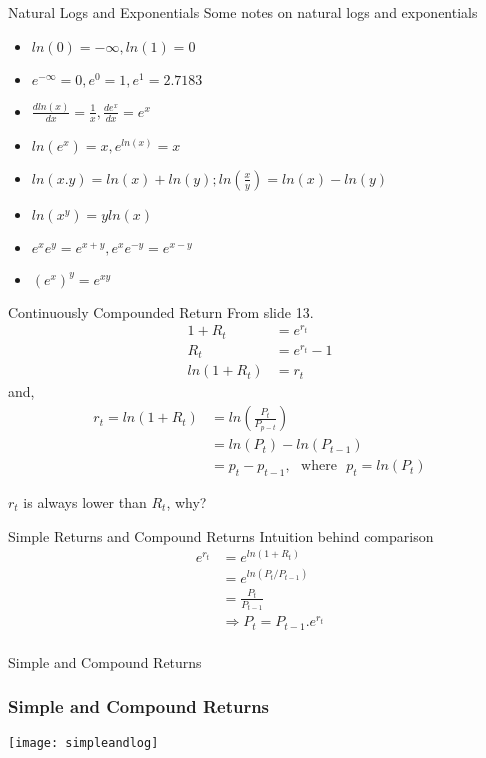\documentclass[14pt,xcolor=pdftex,dvipsnames,table]{beamer}
\begin{document}
\begin{frame}{Natural Logs and Exponentials}
Some notes on natural logs and exponentials
\begin{itemize}
\item $ln(0) = -\infty, ln(1) = 0$
\item $e^{-\infty} = 0, e^0 = 1, e^1 = 2.7183$
\item $\frac{dln(x)}{dx} = \frac{1}{x}, \frac{de^x}{dx}=e^x$
\item $ ln(e^x) = x, e^{ln(x)} = x$
\item $ln(x . y) = ln(x) + ln(y); ln \left ( \frac{x}{y} \right )= ln(x) - ln(y)$
\item $ln(x^y) = yln(x)$
\item $e^xe^y = e^{x+y}, e^xe^{-y} = e^{x-y}$
\item $(e^x)^y = e^{xy}$
\end{itemize}
\end{frame}

\begin{frame}{Continuously Compounded Return}
From slide 13. 
\begin{align*}
1 + R_t &= e^{r_t}\\
R_t &= e^{r_t}-1\\
ln(1+R_t) &= r_t
\end{align*}
and, 
\begin{align*}
r_t = ln(1 + R_t) &= ln \left(\frac{P_t}{P_{p-t}}\right)\\
&= ln(P_t) - ln(P_{t-1})\\
& = p_t - p_{t-1}, \hspace{8pt} \text{where} \hspace{8pt} p_t = ln(P_t)  
\end{align*}

$r_t$ is always lower than $R_t$, why?
\end{frame}



\begin{frame}{Simple Returns and Compound Returns}
Intuition behind comparison
\begin{align*}
e^{r_t}&=e^{ln(1+R_t)}\\ 
&=e^{ln(P_t/P_{t-1})} \\
&= \frac{P_t}{P_{t-1}}\\
&\Rightarrow P_t = P_{t-1}.e^{r_t}\\
\end{align*}
\end{frame}

\begin{frame}{Simple and Compound Returns}
\frametitle{Simple and Compound Returns}
\begin{center}
\texttt{[image: simpleandlog]}
\end{center}
\end{frame} 
\end{document}
